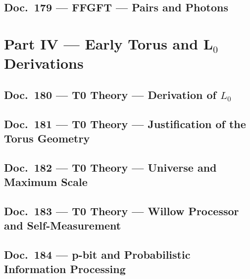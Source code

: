 	\chapter{Doc.~179 --- FFGFT — Pairs and Photons}
	
	\part{Part IV --- Early Torus and L$_0$ Derivations}
	\chapter{Doc.~180 --- T0 Theory — Derivation of $L_0$}
	
	\chapter{Doc.~181 --- T0 Theory — Justification of the Torus Geometry}
	
	\chapter{Doc.~182 --- T0 Theory — Universe and Maximum Scale}
	
	\chapter{Doc.~183 --- T0 Theory — Willow Processor and Self-Measurement}
	
	\chapter{Doc.~184 --- p-bit and Probabilistic Information Processing}
	{\let\maketitle\relax\let\tableofcontents\relax}

